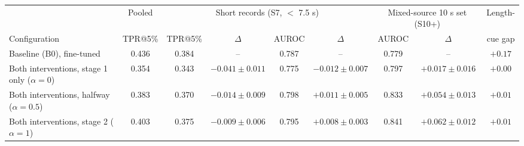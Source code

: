 \begin{tabular}{l c c c c c c c c}
\hline
 & Pooled & \multicolumn{4}{c}{Short records (S7, $<$ 7.5 s)} & \multicolumn{2}{c}{Mixed-source 10 s set (S10+)} & Length- \\
Configuration & TPR@5\% & TPR@5\% & $\Delta$ & AUROC & $\Delta$ & AUROC & $\Delta$ & cue gap \\
\hline
Baseline (B0), fine-tuned & 0.436 & 0.384 & -- & 0.787 & -- & 0.779 & -- & $+0.17$ \\
Both interventions, stage 1 only ($\alpha=0$) & 0.354 & 0.343 & $-0.041 \pm 0.011$ & 0.775 & $-0.012 \pm 0.007$ & 0.797 & $+0.017 \pm 0.016$ & $+0.00$ \\
Both interventions, halfway ($\alpha=0.5$) & 0.383 & 0.370 & $-0.014 \pm 0.009$ & 0.798 & $+0.011 \pm 0.005$ & 0.833 & $+0.054 \pm 0.013$ & $+0.01$ \\
Both interventions, stage 2 ($\alpha=1$) & 0.403 & 0.375 & $-0.009 \pm 0.006$ & 0.795 & $+0.008 \pm 0.003$ & 0.841 & $+0.062 \pm 0.012$ & $+0.01$ \\
\hline
\end{tabular}

